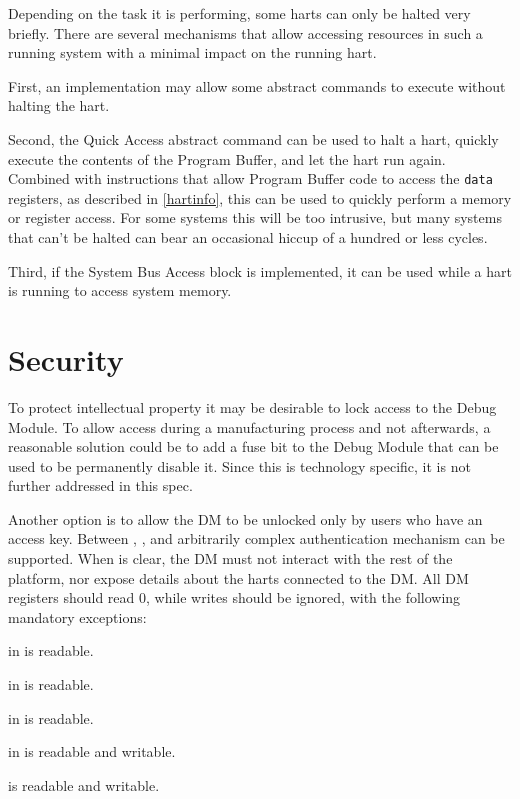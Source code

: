 Depending on the task it is performing, some harts can only be halted very briefly.
There are several mechanisms that allow accessing resources in such a running system
with a minimal impact on the running hart.

First, an implementation may allow some abstract commands to execute without halting the hart.

Second, the Quick Access abstract command can be used to halt a hart, quickly
execute the contents of the Program Buffer, and let the hart run again.
Combined with instructions that allow Program Buffer code to access the
{\tt data} registers, as described in \ref{hartinfo}, this can be used to quickly
perform a memory or register access. For some systems this will be too
intrusive, but many systems that can't be halted can bear an occasional hiccup
of a hundred or less cycles.

Third, if the System Bus Access block is implemented, it can be used while a
hart is running to access system memory.

\section{Security}

To protect intellectual property it may be desirable to lock access to the
Debug Module.  To allow access during a manufacturing process and not
afterwards, a reasonable solution could be to add a fuse bit to the Debug
Module that can be used to be permanently disable it. Since this is technology
specific, it is not further addressed in this spec.

Another option is to allow the DM to be unlocked only by users who have an
access key. Between \Fauthenticated, \Fauthbusy, and \Rauthdata arbitrarily
complex authentication mechanism can be supported.  When \Fauthenticated is
clear, the DM must not interact with the rest of the platform, nor expose
details about the harts connected to the DM. All DM registers should read 0,
while writes should be ignored, with the following mandatory exceptions:
\begin{steps}{}
    \item \Fauthenticated in \Rdmstatus is readable.
    \item \Fauthbusy in \Rdmstatus is readable.
    \item \Fversion in \Rdmstatus is readable.
    \item \Fdmactive in \Rdmcontrol is readable and writable.
    \item \Rauthdata is readable and writable.
\end{steps}

